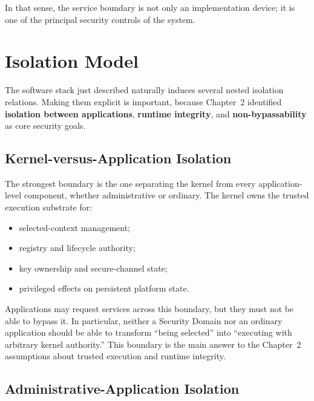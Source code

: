In that sense, the service boundary is not only an implementation device;
it is one of the principal security controls of the system.

\section{Isolation Model}
\label{sec:system-isolation-model}


The software stack just described naturally induces several nested
isolation relations. Making them explicit is important, because
Chapter~2 identified \textbf{isolation between applications},
\textbf{runtime integrity}, and \textbf{non-bypassability} as core
security goals.

\subsection{Kernel-versus-Application Isolation}

The strongest boundary is the one separating the kernel from every
application-level component, whether administrative or ordinary. The
kernel owns the trusted execution substrate for:
\begin{itemize}
\item selected-context management;
\item registry and lifecycle authority;
\item key ownership and secure-channel state;
\item privileged effects on persistent platform state.
\end{itemize}

Applications may request services across this boundary, but they must not
be able to bypass it. In particular, neither a Security Domain nor an
ordinary application should be able to transform ``being selected'' into
``executing with arbitrary kernel authority.'' This boundary is the main
answer to the Chapter~2 assumptions about trusted execution and runtime
integrity.

\subsection{Administrative-Application Isolation}

